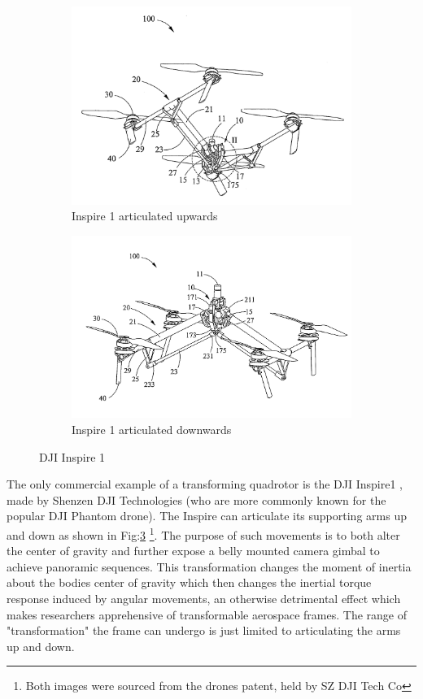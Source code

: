 \begin{figure}[htbp]
\centering
\begin{subfigure}{.5\textwidth}
\centering
\includegraphics[width=\textwidth]{figs/dji-inspire1}
\caption{Inspire 1 articulated upwards}
\label{fig:inspireup}
\end{subfigure}%
\begin{subfigure}{.5\textwidth}
\centering
\includegraphics[width=\textwidth]{figs/dji-inspire2}
\caption{Inspire 1 articulated downwards}
\label{fig:inspiredown}
\end{subfigure}
\caption{DJI Inspire 1}
\label{fig:inspire1}
\end{figure}
The only commercial example of a transforming quadrotor is the DJI Inspire1 \cite{inspire}, made by Shenzen DJI Technologies (who are more commonly known for the popular DJI Phantom drone). The Inspire can articulate its supporting arms up and down as shown in Fig:\ref{fig:inspire1} \footnote{Both images were sourced from the drones patent, held by SZ DJI Tech Co\cite{djinspire}}. The purpose of such movements is to both alter the center of gravity and further expose a belly mounted camera gimbal to achieve panoramic sequences. This transformation changes the moment of inertia about the bodies center of gravity which then changes the inertial torque response induced by angular movements, an otherwise detrimental effect which makes researchers apprehensive of transformable aerospace frames. The range of "transformation" the frame can undergo is just limited to articulating the arms up and down.
